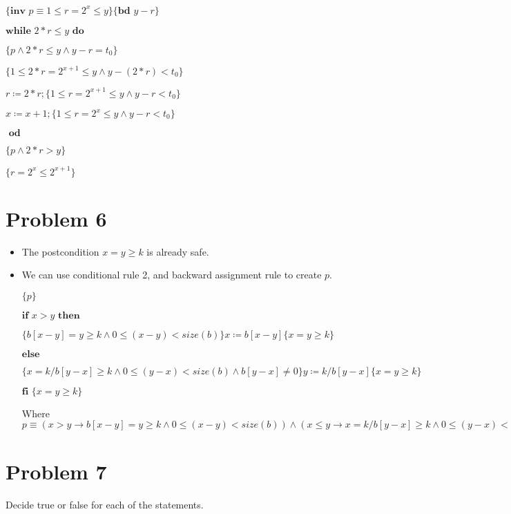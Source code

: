 \documentclass{article}
\begin{document}
$\{\textbf{inv }p \equiv 1 \leq r=2^x \leq y \}\{\textbf{bd }y-r\}$

$ \textbf{while } 2*r \leq y \textbf{ do }$

\qquad \qquad $\{p \wedge 2*r \leq y \wedge y-r=t_0 \}$

\qquad \qquad $\{1 \leq 2*r=2^{x+1} \leq y \wedge y-(2*r)<t_0 \}$

\qquad \qquad $r \coloneqq 2*r;\{1 \leq r=2^{x+1} \leq y \wedge y-r<t_0\}$

\qquad \qquad $x \coloneqq x+1;\{1 \leq r=2^x \leq y \wedge y-r<t_0 \}$

$ \textbf { od}$

$ \{p \wedge 2*r > y \}$

$ \{r=2^x \leq 2^{x+1} \}$


\section*{Problem 6}

\begin{itemize}
    \item The postcondition $x=y \geq k$ is already safe.
    \item We can use conditional rule 2, and backward assignment rule to create $p$.

    $\{p\}$

    $\textbf{if } x>y \textbf{ then}$

    \qquad \qquad $\{b[x-y]=y \geq k \wedge 0 \leq (x-y) < size(b)\}x \coloneqq b[x-y] \{x=y \geq k\}$

    $\textbf{else}$

    \qquad \qquad $ \{x=k/b[y-x] \geq k \wedge 0 \leq (y-x) < size(b) \wedge b[y-x] \neq 0\}y \coloneqq k/b[y-x] \{x=y \geq k\}$

    $\textbf{fi } \{x=y \geq k\}$


    \vspace{10pt}
    Where $p \equiv (x>y \rightarrow b[x-y]=y \geq k \wedge 0 \leq (x-y) < size(b)) \wedge (x \leq y \rightarrow x=k/b[y-x] \geq k \wedge 0 \leq (y-x) < size(b) \wedge b[y-x] \neq 0)$

\end{itemize}


\section*{Problem 7}

Decide true or false for each of the statements.
\end{document}
